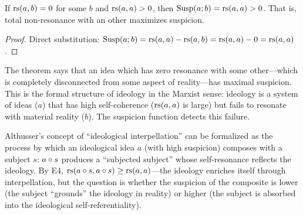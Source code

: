 \begin{theorem}
\label{thm:suspicion-nonidentical}
If $\mathrm{rs}(a, b) = 0$ for some $b$ and $\mathrm{rs}(a, a) > 0$, then
$\mathrm{Susp}(a; b) = \mathrm{rs}(a, a) > 0$. That is, total non-resonance
with an other maximizes suspicion.
\end{theorem}

\begin{proof}
Direct substitution:
$\mathrm{Susp}(a; b) = \mathrm{rs}(a, a) - \mathrm{rs}(a, b) = \mathrm{rs}(a, a) - 0 = \mathrm{rs}(a, a)$.
\end{proof}

\begin{interpretation}
The theorem says that an idea which has zero resonance with some
other---which is completely disconnected from some aspect of reality---has
maximal suspicion. This is the formal structure of ideology in the Marxist
sense: ideology is a system of ideas ($a$) that has high self-coherence
($\mathrm{rs}(a, a)$ is large) but fails to resonate with material reality ($b$).
The suspicion function detects this failure.

Althusser's concept of ``ideological interpellation'' can be formalized as
the process by which an ideological idea $a$ (with high suspicion) composes
with a subject $s$: $a \circ s$ produces a ``subjected subject'' whose
self-resonance reflects the ideology. By E4, $\mathrm{rs}(a \circ s, a \circ s)
\geq \mathrm{rs}(a, a)$---the ideology enriches itself through interpellation, but
the question is whether the suspicion of the composite is lower (the subject
``grounds'' the ideology in reality) or higher (the subject is absorbed into
the ideological self-referentiality).
\end{interpretation}

